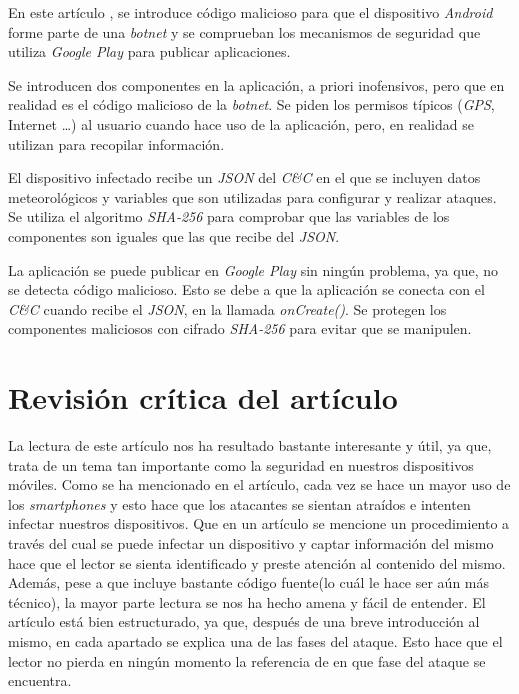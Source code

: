 \documentclass[a4paper,11pt]{report}
\begin{document}
En este artículo \cite{posterior2}, se introduce código malicioso para que el dispositivo \emph{Android} forme parte de una \emph{botnet} y se comprueban los mecanismos de seguridad que utiliza \emph{Google Play} para publicar aplicaciones.

Se introducen dos componentes en la aplicación, a priori inofensivos, pero que en realidad es el código malicioso de la \emph{botnet}. Se piden los permisos típicos (\emph{GPS}, Internet \ldots) al usuario cuando hace uso de la aplicación, pero, en realidad se utilizan para recopilar información.

El dispositivo infectado recibe un \emph{JSON} del \emph{C\&{}C} en el que se incluyen datos meteorológicos y variables que son utilizadas para configurar y realizar ataques. Se utiliza el algoritmo \emph{SHA-256} para comprobar que las variables de los componentes son iguales que las que recibe del \emph{JSON}.

La aplicación se puede publicar en \emph{Google Play} sin ningún problema, ya que, no se detecta código malicioso. Esto se debe a que la aplicación se conecta con el \emph{C\&{}C} cuando recibe el \emph{JSON}, en la llamada \emph{onCreate()}. Se protegen los componentes maliciosos con cifrado \emph{SHA-256} para evitar que se manipulen.



\chapter{Revisión crítica del artículo}\label{Critica}

La lectura de este artículo nos ha resultado bastante interesante y útil, ya que, trata de un tema tan importante como la seguridad en nuestros dispositivos móviles. Como se ha mencionado en el artículo, cada vez se hace un mayor uso de los \emph{smartphones} y esto hace que los atacantes se sientan atraídos e intenten infectar nuestros dispositivos. Que en un artículo se mencione un procedimiento a través del cual se puede infectar un dispositivo y captar información del mismo hace que el lector se sienta identificado y preste atención al contenido del mismo. Además, pese a que incluye bastante código fuente(lo cuál le hace ser aún más técnico), la mayor parte lectura se nos ha hecho amena y fácil de entender. El artículo está bien estructurado, ya que, después de una breve introducción al mismo, en cada apartado se explica una de las fases del ataque. Esto hace que el lector no pierda en ningún momento la referencia de en que fase del ataque se encuentra. 
\end{document}
